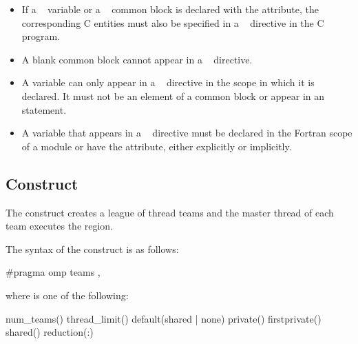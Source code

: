 \begin{itemize}
\item If a ~ variable or a ~ common block is declared 
with the  attribute, the corresponding C entities must also be specified in a 
~ directive in the C program.

\item A blank common block cannot appear in a ~ directive.

\item A variable can only appear in a ~ directive in the scope in which it 
is declared. It must not be an element of a common block or appear in an 
 statement.

\item A variable that appears in a ~ directive must be declared in the 
Fortran scope of a module or have the  attribute, either explicitly or implicitly. 
\end{itemize}
\fortranspecificend









\subsection{ Construct}
\label{subsec:teams Construct}
\summary
The  construct creates a league of thread teams and the master thread of each 
team executes the region.

\syntax
\ccppspecificstart
The syntax of the  construct is as follows:

\begin{boxedcode}
\#pragma omp teams \plc{[clause[ [},\plc{] clause] ... ] new-line}
\end{boxedcode}

where  is one of the following:

\begin{indentedcodelist}
num\_teams()
thread\_limit()
default(shared \textnormal{|} none)
private()
firstprivate()
shared()
reduction(:)
\end{indentedcodelist}
\ccppspecificend

